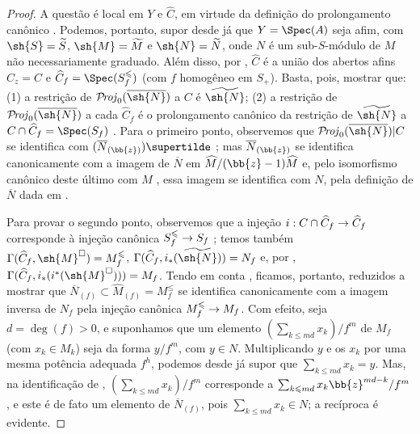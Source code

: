 \documentclass[oneside,10pt]{amsart}
\makeatletter
\renewcommand{\leq}{\leqslant}
\newcommand{\ega@arrow}[2]{\mathchoice{#1}{#2}{#2}{#2}}
\renewcommand{\to}{\ega@arrow{\longrightarrow}{\rightarrow}}
\def\shProj{\mathcal{P}\!\mathit{roj}}
\makeatother
\begin{document}
\begin{proof}
A questão é local em $Y$ e $\widehat{C}$, em virtude da definição do prolongamento canônico .
Podemos, portanto, supor desde já que $Y=\Spec(A)$ seja afim, com $\sh{S}=\widetilde{S}$, $\sh{M}=\widetilde{M}$ e $\sh{N}=\widetilde{N}$, onde $N$ é um sub-$S$-módulo de $M$ não necessariamente graduado.
Além disso, por , $\widehat{C}$ é a união dos abertos afins $\widehat{C}_z=C$ e $\widehat{C}_f=\Spec(S_f^\leq)$ (com $f$ homogêneo em $S_+$).
Basta, pois, mostrar que: (1) a restrição de $\shProj_0(\overline{\sh{N}})$ a $C$ é $\widetilde{\sh{N}}$; (2) a restrição de $\shProj_0(\overline{\sh{N}})$ a cada $\widehat{C}_f$ é o prolongamento canônico da restrição de $\widetilde{\sh{N}}$ a $C\cap\widehat{C}_f=\Spec(S_f)$ .
Para o primeiro ponto, observemos que $\shProj_0(\overline{\sh{N}})|C$ se identifica com $(\overline{N}_{(\bb{z})})\supertilde$ ;
mas $\overline{N}_{(\bb{z})}$ se identifica canonicamente  com a imagem de $\overline{N}$ em $\widehat{M}/(\bb{z}-1)\widehat{M}$ e, pelo isomorfismo canônico deste último com $M$ , essa imagem se identifica com $N$, pela definição de $\overline{N}$ dada em .

Para provar o segundo ponto, observemos que a injeção $i:C\cap\widehat{C}_f\to\widehat{C}_f$ corresponde à injeção canônica $S_f^\leq\to S_f$ ;
temos também $\Gamma(\widehat{C}_f,\sh{M}^\square)=M_f^\leq$, $\Gamma(\widehat{C}_f,i_*(\widetilde{\sh{N}}))=N_f$ e, por , $\Gamma(\widehat{C}_f,i_*(i^*(\sh{M}^\square)))=M_f$.
Tendo em conta , ficamos, portanto, reduzidos a mostrar que $\overline{N}_{(f)}\subset\widehat{M}_{(f)}=M_f^\leq$ se identifica canonicamente com a imagem inversa de $N_f$ pela injeção canônica $M_f^\leq\to M_f$.
Com efeito, seja $d=\deg(f)>0$, e suponhamos que um elemento $(\sum_{k\leq md}x_k)/f^m$ de $M_f$ (com $x_k\in M_k$) seja da forma $y/f^m$, com $y\in N$.
Multiplicando $y$ e os $x_k$ por uma mesma potência adequada $f^h$, podemos desde já supor que $\sum_{k\leq md}x_k=y$.
Mas, na identificação de , $(\sum_{k\leq md}x_k)/f^m$ corresponde a $\sum_{k\leq md}x_k\bb{z}^{md-k}/f^m$, e este é de fato um elemento de $\overline{N}_{(f)}$, pois $\sum_{k\leq md}x_k\in N$;
a recíproca é evidente.
\end{proof}
\end{document}
